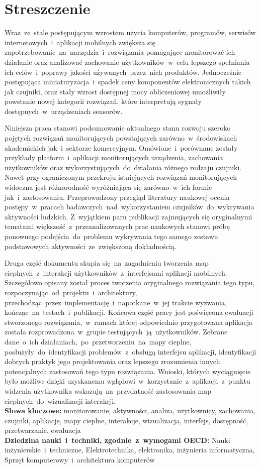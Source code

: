 \chapter*{Streszczenie}
Wraz~ze~stale postępującym wzrostem użycia komputerów, programów, serwisów internetowych~i~aplikacji mobilnych zwiększa się zapotrzebowanie~na~narzędzia~i~rozwiązania pomagające monitorować ich działanie oraz analizować zachowanie użytkowników~w~celu lepszego spełniania ich celów~i~poprawy jakości używanych~przez~nich produktów. Jednocześnie postępująca miniaturyzacja~i~spadek ceny komponentów elektronicznych takich jak czujniki, oraz stały wzrost dostępnej mocy obliczeniowej umożliwiły powstanie nowej kategorii rozwiązań, które interpretują sygnały dostępnych~w~urządzeniach sensorów. 

Niniejsza praca stanowi podsumowanie aktualnego stanu rozwoju szeroko pojętych rozwiązań monitorujących powstających zarówno~w~środowiskach akademickich jak~i~sektorze komercyjnym. Omówione~i~porównane zostały przykłady platform~i~aplikacji monitorujących urządzenia, zachowania użytkowników oraz wykorzystujących~do~działania różnego rodzaju czujniki. Nawet przy ograniczonym przekroju istniejących rozwiązań monitorujących widoczna jest różnorodność wyróżniająca się zarówno~w~ich formie jak~i~zastosowaniu. Przeprowadzony przegląd literatury naukowej ocenia postępy~w~pracach badawczych~nad~wykorzystaniem czujników~do~wykrywania aktywności ludzkich. Z~wyjątkiem paru publikacji zajmujących się oryginalnymi tematami większość~z~przeanalizowanych prac naukowych stanowi próbę ponownego podejścia~do~problemu wykrywania tego samego zestawu podstawowych aktywności~ze~zwiększoną dokładnością. 

Druga część dokumentu skupia się~na~zagadnieniu tworzenia map cieplnych~z~interakcji użytkowników~z~interfejsami aplikacji mobilnych. Szczegółowo opisany został proces tworzenia oryginalnego rozwiązania tego typu, rozpoczynając~od~projektu~i~architektury, przechodząc~przez~implementację~i~napotkane~w~jej trakcie wyzwania, kończąc~na~testach~i~publikacji. Końcowa część pracy jest poświęcona ewaluacji stworzonego rozwiązania,~w~ramach której odpowiednio przygotowana aplikacja została rozprowadzona~w~grupie testujących~ją~użytkowników. Zebrane dane~o~ich działaniach,~po~przetworzeniu~na~mapy cieplne, posłużyły~do~identyfikacji problemów~z~obsługą interfejsu aplikacji, identyfikacji dobrych praktyk jego projektowania oraz lepszego zrozumienia innych potencjalnych zastosowań tego typu rozwiązania. Wnioski, których wyciągnięcie było możliwe dzięki uzyskanemu wglądowi~w~korzystanie~z~aplikacji~z~punktu widzenia użytkownika wskazują~na~przydatność zastosowania map cieplnych~do~wizualizacji interakcji. \\

\noindent\textbf{Słowa kluczowe:} monitorowanie, aktywności, analiza, użytkownicy, zachowania, czujniki, aplikacje, mapy cieplne, interakcje, wizualizacja, interfejs, dostępność, przetwarzanie, ewaluacja \\

\noindent\textbf{Dziedzina nauki~i~techniki, zgodnie~z~wymogami OECD:} Nauki inżynierskie~i~techniczne, Elektrotechnika, elektronika, inżynieria informatyczna, Sprzęt komputerowy~i~architektura komputerów
